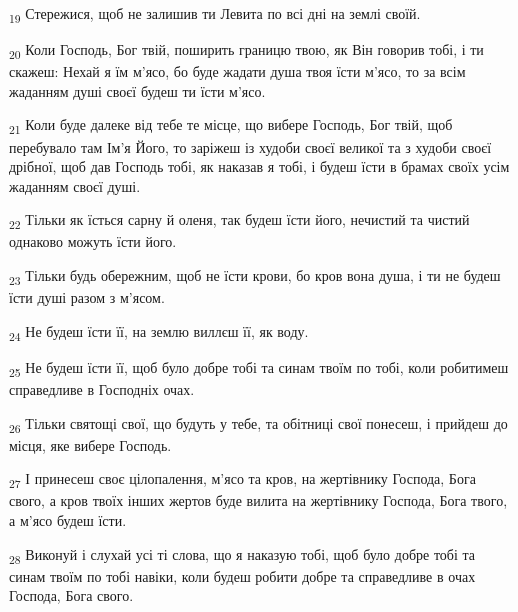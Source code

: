 \begin{tcolorbox}
\textsubscript{19} Стережися, щоб не залишив ти Левита по всі дні на землі своїй.
\end{tcolorbox}
\begin{tcolorbox}
\textsubscript{20} Коли Господь, Бог твій, поширить границю твою, як Він говорив тобі, і ти скажеш: Нехай я їм м'ясо, бо буде жадати душа твоя їсти м'ясо, то за всім жаданням душі своєї будеш ти їсти м'ясо.
\end{tcolorbox}
\begin{tcolorbox}
\textsubscript{21} Коли буде далеке від тебе те місце, що вибере Господь, Бог твій, щоб перебувало там Ім'я Його, то заріжеш із худоби своєї великої та з худоби своєї дрібної, щоб дав Господь тобі, як наказав я тобі, і будеш їсти в брамах своїх усім жаданням своєї душі.
\end{tcolorbox}
\begin{tcolorbox}
\textsubscript{22} Тільки як їсться сарну й оленя, так будеш їсти його, нечистий та чистий однаково можуть їсти його.
\end{tcolorbox}
\begin{tcolorbox}
\textsubscript{23} Тільки будь обережним, щоб не їсти крови, бо кров вона душа, і ти не будеш їсти душі разом з м'ясом.
\end{tcolorbox}
\begin{tcolorbox}
\textsubscript{24} Не будеш їсти її, на землю виллєш її, як воду.
\end{tcolorbox}
\begin{tcolorbox}
\textsubscript{25} Не будеш їсти її, щоб було добре тобі та синам твоїм по тобі, коли робитимеш справедливе в Господніх очах.
\end{tcolorbox}
\begin{tcolorbox}
\textsubscript{26} Тільки святощі свої, що будуть у тебе, та обітниці свої понесеш, і прийдеш до місця, яке вибере Господь.
\end{tcolorbox}
\begin{tcolorbox}
\textsubscript{27} І принесеш своє цілопалення, м'ясо та кров, на жертівнику Господа, Бога свого, а кров твоїх інших жертов буде вилита на жертівнику Господа, Бога твого, а м'ясо будеш їсти.
\end{tcolorbox}
\begin{tcolorbox}
\textsubscript{28} Виконуй і слухай усі ті слова, що я наказую тобі, щоб було добре тобі та синам твоїм по тобі навіки, коли будеш робити добре та справедливе в очах Господа, Бога свого.
\end{tcolorbox}
